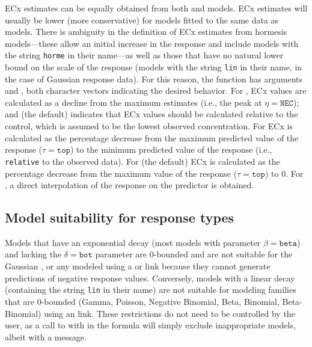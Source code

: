 \documentclass[
  shortnames]{jss}
\begin{document}
ECx estimates can be equally obtained from both  and  models. ECx estimates will usually be lower (more conservative) for  models fitted to the same data as  models. There is ambiguity in the definition of ECx estimates from hormesis models---these allow an initial increase in the response \citep[see][]{Mattson2008} and include models with the string \texttt{horme} in their name---as well as those that have no natural lower bound on the scale of the response (models with the string \texttt{lin} in their name, in the case of Gaussian response data). For this reason, the  function has arguments  and , both character vectors indicating the desired behavior. For , ECx values are calculated as a decline from the maximum estimates (i.e., the peak at \(\eta = \mathtt{NEC}\)); and  (the default) indicates that ECx values should be calculated relative to the control, which is assumed to be the lowest observed concentration. For  ECx is calculated as the percentage decrease from the maximum predicted value of the response (\(\tau = \mathtt{top}\)) to the minimum predicted value of the response (i.e., \texttt{relative} to the observed data). For  (the default) ECx is calculated as the percentage decrease from the maximum value of the response (\(\tau = \mathtt{top}\)) to 0. For , a direct interpolation of the response on the predictor is obtained.

\hypertarget{model-suitability-for-response-types}{%
\subsection{Model suitability for response types}\label{model-suitability-for-response-types}}

Models that have an exponential decay (most models with parameter \(\beta = \mathtt{beta}\)) and lacking the \(\delta = \mathtt{bot}\) parameter are 0-bounded and are not suitable for the Gaussian , or any  modeled using a  or  link because they cannot generate predictions of negative response values. Conversely, models with a linear decay (containing the string \texttt{lin} in their name) are not suitable for modeling families that are 0-bounded (Gamma, Poisson, Negative Binomial, Beta, Binomial, Beta-Binomial) using an  link. These restrictions do not need to be controlled by the user, as a call to  with  in the formula will simply exclude inappropriate models, albeit with a message.
\end{document}
